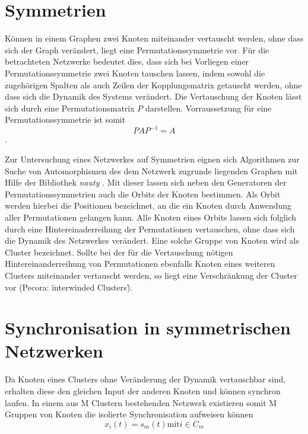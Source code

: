 \section{Symmetrien}
Können in einem Graphen zwei Knoten miteinander vertauscht werden, ohne dass sich der Graph verändert, liegt eine Permutationssymmetrie vor. Für die betrachteten Netzwerke bedeutet dies, dass sich bei Vorliegen einer Permutationssymmetrie zwei Knoten tauschen lassen, indem sowohl die zugehörigen Spalten als auch Zeilen der Kopplungsmatrix getauscht werden, ohne dass sich die Dynamik des Systems verändert. Die Vertauschung der Knoten lässt sich durch eine Permutationsmatrix $P$ darstellen. Vorraussetzung für eine Permutationssymmetrie ist somit
\begin{equation}
PAP^{-1}=A
\end{equation}.

Zur Untersuchung eines Netzwerkes auf Symmetrien eignen sich Algorithmen zur Suche von Automorphismen des dem Netzwerk zugrunde liegenden Graphen mit Hilfe der Bibliothek \textit{nauty} \cite{nauty}. Mit dieser lassen sich neben den Generatoren der Permutationssymmetrien auch die Orbits der Knoten bestimmen. Als Orbit werden hierbei die Positionen bezeichnet, an die ein Knoten durch Anwendung aller Permutationen gelangen kann. Alle Knoten eines Orbits lassen sich folglich durch eine Hintereinaderreihung der Permutationen vertauschen, ohne dass sich die Dynamik des Netzwerkes verändert. Eine solche Gruppe von Knoten wird als Cluster bezeichnet. Sollte bei der für die Vertauschung nötigen Hintereinanderreihung von Permutationen ebenfalls Knoten eines weiteren Clusters miteinander vertauscht werden, so liegt eine Verschränkung der Cluster vor (Pecora: \"interwinded Clusters\").

\section{Synchronisation in symmetrischen Netzwerken}
Da Knoten eines Clusters ohne Veränderung der Dynamik vertauschbar sind, erhalten diese den gleichen Input der anderen Knoten und können synchron laufen. In einem aus M Clustern bestehenden Netzwerk existieren somit M Gruppen von Knoten die isolierte Synchronisation aufweisen können 
\begin{equation}
x_i(t)=s_m(t)\text{mit} i\in C_m
\end{equation}


